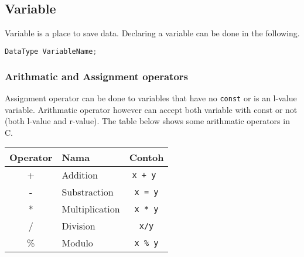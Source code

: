 \subsection{Variable}
Variable is a place to save data. Declaring a variable can be done in the following.
\begin{lstlisting}[language=c,caption=Deklarasi Variabel C,label=lst:deklarasivariabel,captionpos=t]
DataType VariableName;
\end{lstlisting}
\subsubsection{Arithmatic and Assignment operators}
Assignment operator can be done to variables that have no \verb*|const| or is an l-value variable. Arithmatic operator however can accept both variable with const or not (both l-value and r-value).
The table below shows some arithmatic operators in C.
\begin{center}
	\begin{tabular}{|c|l|c|}
		\hline
		\multicolumn{1}{|l|}{\textbf{Operator}} & \textbf{Nama} & \multicolumn{1}{l|}{\textbf{Contoh}} \\ \hline
		+  & Addition &\verb|x + y |  \\ \hline
		-  & Substraction &\verb|x = y|   \\ \hline
		*  & Multiplication   & \verb|x * y|  \\ \hline
		/  & Division   & \verb|x/y|  \\ \hline
		\% & Modulo     & \verb|x % y| \\ \hline
	\end{tabular}
\end{center}

